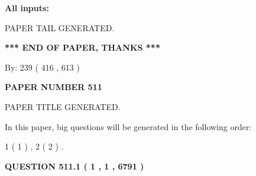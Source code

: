 \documentclass[12pt]{article}
\begin{document}
   
   
   
\noindent{}
   
   
   
   
\noindent\vspace{0.1in}\hspace{-0.08in} {\textbf{\Large{All inputs: }}}
   
   
   
   
   
   
 \vspace{0.2in}
 
   
   
\vspace{2.0in} PAPER TAIL GENERATED.
   
   
   
   
\vspace{1.0in} 
{\textbf{\large{ *** END OF PAPER, THANKS *** }}} 
   
   
\hspace{1.0in} By: 
 239 ( 416 ,  613 )
   
   
   
   
\newpage 
\setcounter{page}{ 
   511001 } 
   
   
   
   
 {\textbf{ \Large{ PAPER NUMBER  511  }}}
   
   
\vspace{0.2in}
   
   
   
   
   
   
   
   
 \vspace{0.2in}
 
 
 
 
   
   
 PAPER TITLE GENERATED.
   
   
   
\vspace{0.2in}
   
In this paper, big questions will be generated in the following order: 
   
   
   1 ( 1 )
 ,
   2 ( 2 )
 .
  
\vspace{0.2in}
  
{\textbf{\Large{QUESTION
511.1 
 ( 1 , 1 , 6791 )
}}}
  
\end{document}
